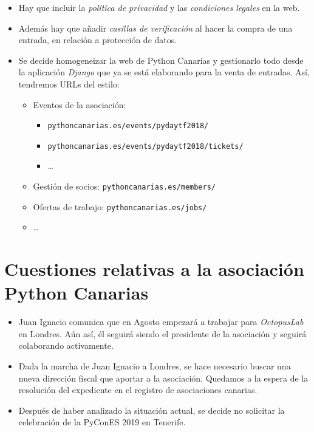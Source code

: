 \documentclass[a4paper, 12pt]{article}
\begin{document}
\begin{itemize}
    \item Hay que incluir la \textit{política de privacidad} y las \textit{condiciones legales} en la web.
    \item Además hay que añadir \textit{casillas de verificación} al hacer la compra de una entrada, en relación a protección de datos.
    \item Se decide homogeneizar la web de Python Canarias y gestionarlo todo desde la aplicación \textit{Django} que ya se está elaborando para la venta de entradas. Así, tendremos URLs del estilo:
    \begin{itemize}
        \item Eventos de la asociación:
        \begin{itemize}
            \item \texttt{pythoncanarias.es/events/pydaytf2018/}
            \item \texttt{pythoncanarias.es/events/pydaytf2018/tickets/}
            \item \ldots
        \end{itemize}
        \item Gestión de socios: \texttt{pythoncanarias.es/members/}
        \item Ofertas de trabajo: \texttt{pythoncanarias.es/jobs/}
        \item \ldots
    \end{itemize}
\end{itemize}

\section{Cuestiones relativas a la asociación Python Canarias}

\begin{itemize}
    \item Juan Ignacio comunica que en Agosto empezará a trabajar para \textit{OctopusLab} en Londres. Aún así, él seguirá siendo el presidente de la asociación y seguirá colaborando activamente.
    \item Dada la marcha de Juan Ignacio a Londres, se hace necesario buscar una nueva dirección fiscal que aportar a la asociación. Quedamos a la espera de la resolución del expediente en el registro de asociaciones canarias.
    \item Después de haber analizado la situación actual, se decide no solicitar la celebración de la PyConES 2019 en Tenerife.
\end{itemize}
\end{document}
